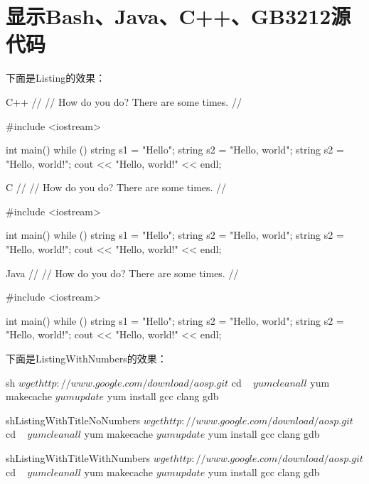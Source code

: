 \section{显示Bash、Java、C++、GB3212源代码}

下面是Listing的效果：

\begin{Listing}{C++}
//
// How do you do? There are some times.
//

#include <iostream>

int main()
{
	while ()
	{
		string s1 = "Hello";
		string s2 = "Hello, world";
		string s2 = "Hello, world!";
		cout << "Hello, world!" << endl;
	}
}
\end{Listing}

\begin{Listing}{C}
//
// How do you do? There are some times.
//

#include <iostream>

int main()
{
	while ()
	{
		string s1 = "Hello";
		string s2 = "Hello, world";
		string s2 = "Hello, world!";
		cout << "Hello, world!" << endl;
	}
}
\end{Listing}


\begin{Listing}{Java}
//
// How do you do? There are some times.
//

#include <iostream>

int main()
{
	while ()
	{
		string s1 = "Hello";
		string s2 = "Hello, world";
		string s2 = "Hello, world!";
		cout << "Hello, world!" << endl;
	}
}
\end{Listing}

下面是ListingWithNumbers的效果：

\begin{ListingWithNumbers}{sh}
$ wget http://www.google.com/download/aosp.git
$ cd ~
$ yum clean all
$ yum makecache
$ yum update
$ yum install gcc clang gdb
\end{ListingWithNumbers}

\begin{ListingWithTitleNoNumbers}{sh}{ListingWithTitleNoNumbers}
$ wget http://www.google.com/download/aosp.git
$ cd ~
$ yum clean all
$ yum makecache
$ yum update
$ yum install gcc clang gdb
\end{ListingWithTitleNoNumbers}

\begin{ListingWithTitleWithNumbers}{sh}{ListingWithTitleWithNumbers}
$ wget http://www.google.com/download/aosp.git
$ cd ~
$ yum clean all
$ yum makecache
$ yum update
$ yum install gcc clang gdb
\end{ListingWithTitleWithNumbers}


